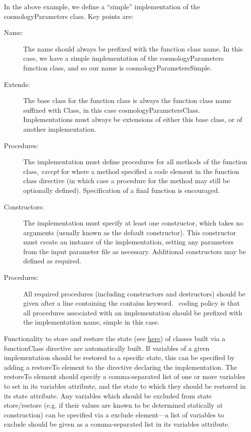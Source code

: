 In the above example, we define a ``simple'' implementation of the {\normalfont cosmologyParameters} class. Key points are:
\begin{description}
\item[Name:] The name should always be prefixed with the function class name. In this case, we have a {\normalfont \ttfamily simple} implementation of the {\normalfont \ttfamily cosmologyParameters} function class, and so our name is {\normalfont \ttfamily cosmologyParametersSimple}.
\item[Extends:] The base class for the function class is always the function class name suffixed with {\normalfont \ttfamily Class}, in this case {\normalfont \ttfamily cosmologyParametersClass}. Implementations must always be extensions of either this base class, or of another implementation.
\item[Procedures:] The implementation must define procedures for all methods of the function class, \emph{except} for where a method specified a {\normalfont \ttfamily code} element in the function class directive (in which case a procedure for the method may still be optionally defined). Specification of a {\normalfont \ttfamily final} function is encouraged.
\item[Constructors:] The implementation must specify at least one constructor, which takes no arguments (usually known as the default constructor). This constructor must create an instance of the implementation, setting any parameters from the input parameter file as necessary. Additional constructors may be defined as required.
\item[Procedures:] All required procedures (including constructors and destructors) should be given after a line containing the {\normalfont \ttfamily contains} keyword. \glc\ coding policy is that all procedures associated with an implementation should be prefixed with the implementation name, {\normalfont \ttfamily simple} in this case.
\end{description}

Functionality to store and restore the state (see \href{https://github.com/galacticusorg/galacticus/releases/download/masterRelease/Galacticus_Usage.pdf\#sec.Restarting}{here}) of classes built via a {\normalfont \ttfamily functionClass} directive are automatically built. If variables of a given implementation should be restored to a specific state, this can be specified by adding a {\normalfont \ttfamily restoreTo} element to the directive declaring the implementation. The {\normalfont \ttfamily restoreTo} element should specify a comma-separated list of one or more variables to set in its {\normalfont \ttfamily variables} attribute, and the state to which they should be restored in its {\normalfont \ttfamily state} attribute. Any variables which should be excluded from state store/restore (e.g. if their values are known to be determined statically at construction) can be specified via a {\normalfont \ttfamily exclude} element---a list of variables to exclude should be given as a comma-separated list in its {\normalfont \ttfamily variables} attribute.

